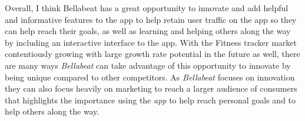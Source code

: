 \documentclass[
]{article}
\begin{document}
Overall, I think Bellabeat has a great opportunity to innovate and add
helpful and informative features to the app to help retain user traffic
on the app so they can help reach their goals, as well as learning and
helping others along the way by including an interactive interface to
the app. With the Fitness tracker market contentiously growing with
large growth rate potential in the future as well, there are many ways
\emph{Bellabeat} can take advantage of this opportunity to innovate by
being unique compared to other competitors. As \emph{Bellabeat} focuses
on innovation they can also focus heavily on marketing to reach a larger
audience of consumers that highlights the importance using the
\emph{app} to help reach personal goals and to help others along the
way.
\end{document}
